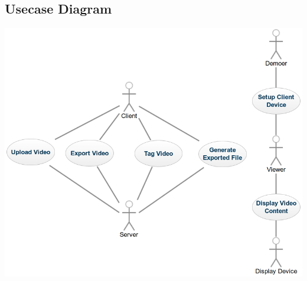 \documentclass[12pt]{report}
\begin{document}
\begin{appendices}
    \chapter{Usecase Diagram}
    \includegraphics[height=\textwidth]{usecase}
\end{appendices}
\end{document}
